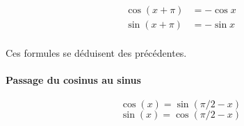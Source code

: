 \begin{align*}
\cos(x+\pi) &= -\cos x\\
\sin(x+\pi) &= -\sin x\\
\end{align*}

Ces formules se déduisent des précédentes.

\paragraph{Passage du cosinus au sinus}

\[ \cos(x)=\sin(\pi/2-x)\]
\[ \sin(x)=\cos(\pi/2-x)\]



